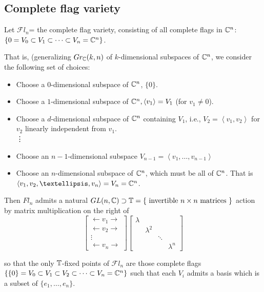 \documentclass{amsart}
\begin{document}
\subsection{Complete flag variety}

Let $\mathcal{F}l_n$= the complete flag variety, consisting of all complete flags in $\mathbb{C}^n$: $\{0 =V_0 \subset V_1 \subset \cdots \subset V_n = \mathbb{C}^n \}$. 

That is, (generalizing $Gr_{\mathbb{C}}(k,n)$ of $k$-dimensional subspaces of $\mathbb{C}^n$, we consider the following set of choices:

\begin{itemize}
    \item Choose a $0$-dimensional subspace of $\mathbb{C}^n$, $\{0\}$. \\
    \item Choose a $1$-dimensional subspace of $\mathbb{C}^n, \left< v_1 \right> = V_1$ (for $v_1\neq 0$). \\
    \item Choose a $d$-dimensional subspace of $\mathbb{C}^n$ containing $V_1$, i.e., $V_2 = \left< v_1, v_2 \right>$ for $v_2$ linearly independent from $v_1$.\\
    \vdots \\
    \item Choose an $n-1$-dimensional subspace $V_{n-1}= \left< v_1, \dots, v_{n-1} \right>$\\
    \item Choose an $n$-dimensional subspace of $\mathbb{C}^n$, which must be all of $\mathbb{C}^n$. That is $\left< v_1, v_2, \dots, v_n \right> = V_n = \C^n$. 
\end{itemize}

Then $Fl_n$ admits a natural $GL(n,\mathbb{C}) \supset \mathbb{T} = \{\text{ invertible }n\times n \text{ matrices }\}$ action by matrix multiplication on the right of \[ \left[ \begin{matrix} \leftarrow v_1 \rightarrow \\ \leftarrow v_2 \rightarrow \\ \vdots \\ \leftarrow v_n \rightarrow \end{matrix} \right] \left[ \begin{matrix} \lambda & & & \\ & \lambda^2 & & \\ & & \ddots & \\ & & & \lambda^n \end{matrix} \right] \]

so that the only $\mathbb{T}$-fixed points of $\mathcal{F}l_n$ are those complete flags $\{ \{0\}=V_0 \subset V_1 \subset V_2 \subset \cdots \subset V_n = \mathbb{C}^n \}$ such that each $V_i$ admits a basis which is a subset of $\{e_1, \dots, e_n \}$. \\
\end{document}
